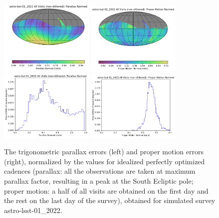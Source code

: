 \documentclass[DM,lsstdraft,authoryear,toc]{lsstdoc}
\begin{document}
\begin{figure}[t!]
\centering
\includegraphics[width=0.4\textwidth]{figures/astro-lsst-01_2022_Parallax_Normed_All_Visits_non-dithered_HEAL_SkyMap.pdf}
\includegraphics[width=0.4\textwidth]{figures/astro-lsst-01_2022_Proper_Motion_Normed_All_Visits_non-dithered_HEAL_SkyMap.pdf} \\
\includegraphics[width=0.4\textwidth]{figures/astro-lsst-01_2022_Parallax_Normed_All_Visits_non-dithered_HEAL_Histogram.pdf}
\includegraphics[width=0.4\textwidth]{figures/astro-lsst-01_2022_Proper_Motion_Normed_All_Visits_non-dithered_HEAL_Histogram.pdf}
\caption{The trigonometric parallax errors (left) and proper motion errors (right), normalized
by the values for idealized perfectly optimized cadences (parallax: all the observations are taken
at maximum parallax factor, resulting in a peak at the South Ecliptic pole; proper motion:
a half of all visits are obtained on the first day and the rest on the last day of the survey),
obtained for simulated survey astro-lsst-01\_2022.
\label{fig:baseline_parapm}}
\end{figure}
\end{document}
